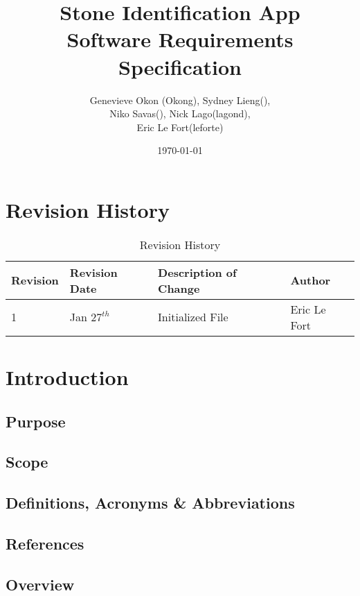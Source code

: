 \documentclass[titlepage]{article}
\begin{document}
\title{Stone Identification App \\
	Software Requirements Specification}
\author{Genevieve Okon (Okong), Sydney Lieng(),\\
	Niko Savas(), Nick Lago(lagond),\\
	Eric Le Fort(leforte)}
\date{\today}
\maketitle

\tableofcontents
\listoffigures
\listoftables

\pagebreak

\section{Revision History}
\begin{table}[h!]
	\begin{tabular}{| p{5cm} | p{5cm} | p{5cm} |p{5cm} |}    \hline
		Revision	&Revision Date		&Description of Change	&Author\\ \hline
		1		& Jan $27^{th}$	&Initialized File			&Eric Le Fort\\ \hline
	\end{tabular}
	\caption{Revision History}
	\label{table:Revision History}
\end{table}


\section{Introduction}
\subsection{Purpose}
\subsection{Scope}
\subsection{Definitions, Acronyms \& Abbreviations}
\subsection{References}
\subsection{Overview}
\end{document}
